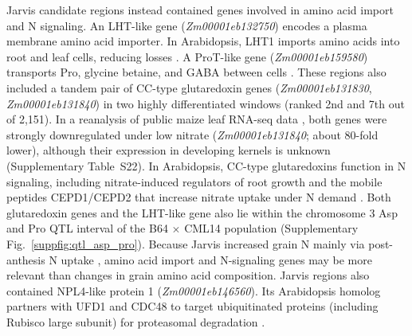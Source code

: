 Jarvis candidate regions instead contained genes involved in amino acid import and N signaling. An LHT-like gene (\textit{Zm00001eb132750}) encodes a plasma membrane amino acid importer. In Arabidopsis, LHT1 imports amino acids into root and leaf cells, reducing losses \citep{Fan2023LHT}. A ProT-like gene (\textit{Zm00001eb159580}) transports Pro, glycine betaine, and GABA between cells \citep{Lehmann2011ProT}. These regions also included a tandem pair of CC-type glutaredoxin genes (\textit{Zm00001eb131830}, \textit{Zm00001eb131840}) in two highly differentiated windows (ranked 2nd and 7th out of 2,151). In a reanalysis of public maize leaf RNA-seq data \citep{Mu2017LN, Guo2022LN, Ma2021LN, TorresRodriguez2021LN, AlonsoNieves2022LN, Wang2025NRT25}, both genes were strongly downregulated under low nitrate (\textit{Zm00001eb131840}; about 80-fold lower), although their expression in developing kernels is unknown (Supplementary Table~S22). In Arabidopsis, CC-type glutaredoxins function in N signaling, including nitrate-induced regulators of root growth and the mobile peptides CEPD1/CEPD2 that increase nitrate uptake under N demand \citep{Patterson2016GRX, Ohkubo2017CEPD}. Both glutaredoxin genes and the LHT-like gene also lie within the chromosome 3 Asp and Pro QTL interval of the B64 $\times$ CML14 population (Supplementary Fig.~\ref{suppfig:qtl_asp_pro}). Because Jarvis increased grain N mainly via post-anthesis N uptake \citep{Moll1994}, amino acid import and N-signaling genes may be more relevant than changes in grain amino acid composition. Jarvis regions also contained NPL4-like protein 1 (\textit{Zm00001eb146560}). Its Arabidopsis homolog partners with UFD1 and CDC48 to target ubiquitinated proteins (including Rubisco large subunit) for proteasomal degradation \citep{Li2022CDC48}.

